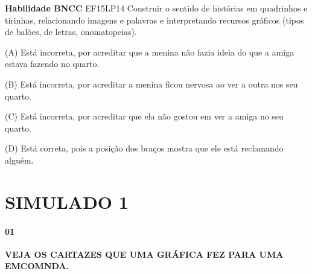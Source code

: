 \begin{escola}
\textbf{Habilidade BNCC} EF15LP14 Construir o sentido de histórias em
quadrinhos e tirinhas, relacionando imagens e palavras e interpretando
recursos gráficos (tipos de balões, de letras, onomatopeias).

(A) Está incorreta, por acreditar que a menina não fazia ideia do que a
amiga estava fazendo no quarto.

(B) Está incorreta, por acreditar a menina ficou nervosa ao ver a outra
nos seu quarto.

(C) Está incorreta, por acreditar que ela não gostou em ver a amiga no
seu quarto.

(D) Está correta, pois a posição dos braços mostra que ele está
reclamando alguém.

\chapter{SIMULADO 1}

\subsubsection{01}\label{section-26}

\textbf{VEJA OS CARTAZES QUE UMA GRÁFICA FEZ PARA UMA EMCOMNDA.}


\end{escola}

